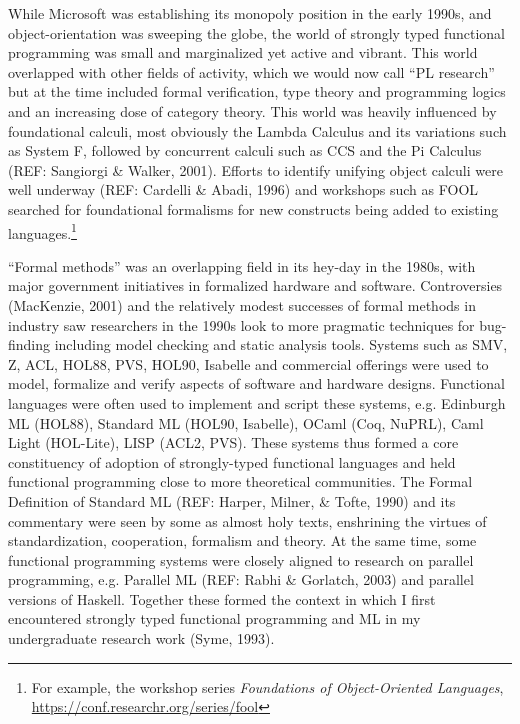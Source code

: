 \documentclass[acmsmall]{acmart}\settopmatter{}
\begin{document}
While Microsoft was establishing its monopoly position in the early 1990s, and object-orientation was sweeping the globe, the world of strongly
typed functional programming was small and marginalized yet active and vibrant.  This world overlapped with other fields of activity, which we
would now call “PL research” but at the time included formal verification, type theory and programming logics and an increasing dose of category
theory. This world was heavily influenced by foundational calculi, most obviously the Lambda Calculus and its variations such as System F, followed by
concurrent calculi such as CCS and the Pi Calculus (REF: Sangiorgi \& Walker, 2001).  Efforts to identify unifying object calculi were well
underway (REF: Cardelli \& Abadi, 1996) and workshops such as FOOL searched for foundational formalisms for new constructs being added to
existing languages.\footnote{For example, the workshop series \textit{Foundations of Object-Oriented Languages}, \url{https://conf.researchr.org/series/fool}} 

“Formal methods” was an overlapping field in its hey-day in the 1980s, with major government initiatives in formalized hardware and software.
Controversies (MacKenzie, 2001) and the relatively modest successes of formal methods in industry saw researchers in the 1990s look to more pragmatic
techniques for bug-finding including model checking and static analysis tools. Systems such as SMV, Z, ACL, HOL88, PVS, HOL90, Isabelle and commercial
offerings were used to model, formalize and verify aspects of software and hardware designs.   Functional languages were often used to implement and
script these systems, e.g. Edinburgh ML (HOL88), Standard ML (HOL90, Isabelle), OCaml (Coq, NuPRL), Caml Light (HOL-Lite), LISP (ACL2, PVS).  These systems
thus formed a core constituency of adoption of strongly-typed functional languages and held functional programming close to more theoretical
communities.  The Formal Definition of Standard ML (REF: Harper, Milner, \& Tofte, 1990) and its commentary were seen by some as almost holy texts, enshrining
the virtues of standardization, cooperation, formalism and theory. At the same time, some functional programming systems were closely aligned to research
on parallel programming, e.g. Parallel ML (REF: Rabhi \& Gorlatch, 2003) and parallel versions of Haskell.  Together these formed the context in which I first
encountered strongly typed functional programming and ML in my undergraduate research work (Syme, 1993).
\end{document}
